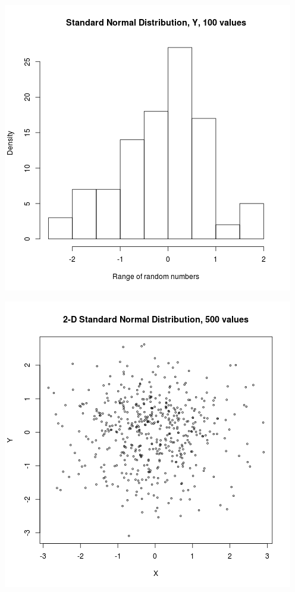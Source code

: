 \documentclass{article}
\begin{document}
\includegraphics{"plot1_1_Y"}
\pagebreak


\includegraphics{"plot1_2"}
\pagebreak
\end{document}
